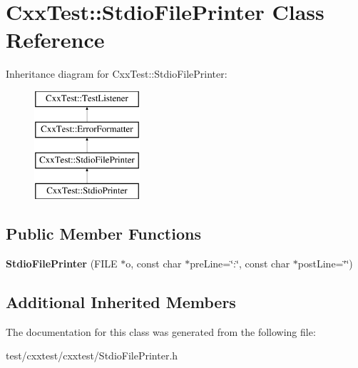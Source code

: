 \hypertarget{classCxxTest_1_1StdioFilePrinter}{\section{Cxx\-Test\-:\-:Stdio\-File\-Printer Class Reference}
\label{classCxxTest_1_1StdioFilePrinter}
}
Inheritance diagram for Cxx\-Test\-:\-:Stdio\-File\-Printer\-:\begin{figure}[H]
\begin{center}
\leavevmode
\includegraphics[height=4.000000cm]{classCxxTest_1_1StdioFilePrinter}
\end{center}
\end{figure}
\subsection*{Public Member Functions}
\begin{DoxyCompactItemize}
\item 
\hypertarget{classCxxTest_1_1StdioFilePrinter_a3fc17987196b398c255b84649ba72aa9}{{\bfseries Stdio\-File\-Printer} (F\-I\-L\-E $\ast$o, const char $\ast$pre\-Line=\char`\"{}\-:\char`\"{}, const char $\ast$post\-Line=\char`\"{}\char`\"{})}\label{classCxxTest_1_1StdioFilePrinter_a3fc17987196b398c255b84649ba72aa9}

\end{DoxyCompactItemize}
\subsection*{Additional Inherited Members}


The documentation for this class was generated from the following file\-:\begin{DoxyCompactItemize}
\item 
test/cxxtest/cxxtest/Stdio\-File\-Printer.\-h\end{DoxyCompactItemize}
